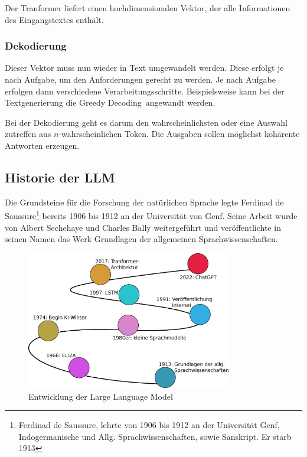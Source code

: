 Der Tranformer liefert einen hochdimensionalen Vektor, der alle Informationen des Eingangstextes enthält.


\subsubsection{Dekodierung}
Dieser Vektor muss nun wieder in Text umgewandelt werden. Diese erfolgt je nach Aufgabe, um den Anforderungen gerecht zu werden. Je nach Aufgabe erfolgen dann verschiedene Verarbeitungsschritte. Beispielsweise kann bei der Textgenerierung die \glqq Greedy Decoding\grqq \ angewandt werden.\vspace{0.2cm}

Bei der Dekodierung geht es darum den wahrscheinlichsten oder eine Auswahl zutreffen aus $n$-wahrscheinlichen Token. Die Ausgaben sollen möglichst kohärente Antworten erzeugen.


\subsection{Historie der LLM}
Die Grundsteine für die Forschung der natürlichen Sprache legte Ferdinad de Saussure\footnote{Ferdinad de Saussure, lehrte von 1906 bis 1912 an der Universität Genf, Indogermanische und Allg. Sprachwissenschaften, sowie Sanskript. Er starb 1913} bereits 1906 bis 1912 an der Universität von Genf. Seine Arbeit wurde von Albert Sechehaye und Charles Bally weitergeführt und veröffentlichte in seinen Namen das Werk \glqq Grundlagen der allgemeinen Sprachwissenschaften\grqq .

\begin{center}
	\begin{figure}[!ht]
		\includegraphics[width=0.8\textwidth]{content/chapter_basics/images/evolution_of_llm.eps}
		\centering
		\caption{Entwicklung der Large Language Model}
		\label{img:evolotion_of_llm}
	\end{figure}
\end{center}

